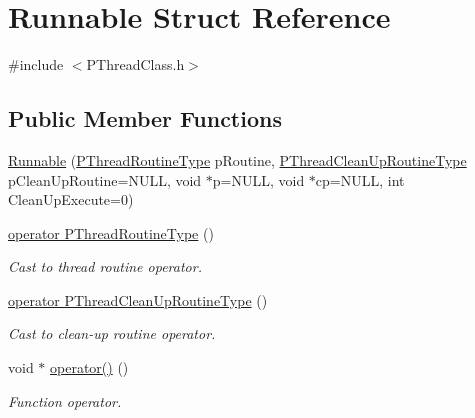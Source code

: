 \hypertarget{structRunnable}{}\section{Runnable Struct Reference}
\label{structRunnable}


{\ttfamily \#include $<$P\+Thread\+Class.\+h$>$}

\subsection*{Public Member Functions}
\begin{DoxyCompactItemize}
\item 
\hyperlink{structRunnable_a55a54a10b0f3733f276d07db584f2549}{Runnable} (\hyperlink{group__FUNC__DEFS_gaeef66643e734485d781ca826339879ea}{P\+Thread\+Routine\+Type} p\+Routine, \hyperlink{group__FUNC__DEFS_ga77ca9e695666040451b77632df4847b9}{P\+Thread\+Clean\+Up\+Routine\+Type} p\+Clean\+Up\+Routine=N\+U\+LL, void $\ast$p=N\+U\+LL, void $\ast$cp=N\+U\+LL, int Clean\+Up\+Execute=0)
\item 
\hyperlink{structRunnable_ad4a6cf9daf0f17048c0a8972e90d295d}{operator P\+Thread\+Routine\+Type} ()
\begin{DoxyCompactList}\small\item\em Cast to thread routine operator. \end{DoxyCompactList}\item 
\hyperlink{structRunnable_a8d99767578589e79ba59f8ddece80e69}{operator P\+Thread\+Clean\+Up\+Routine\+Type} ()
\begin{DoxyCompactList}\small\item\em Cast to clean-\/up routine operator. \end{DoxyCompactList}\item 
void $\ast$ \hyperlink{structRunnable_a017eeb87c9076ffcb34338bba7fefb99}{operator()} ()
\begin{DoxyCompactList}\small\item\em Function operator. \end{DoxyCompactList}\end{DoxyCompactItemize}

